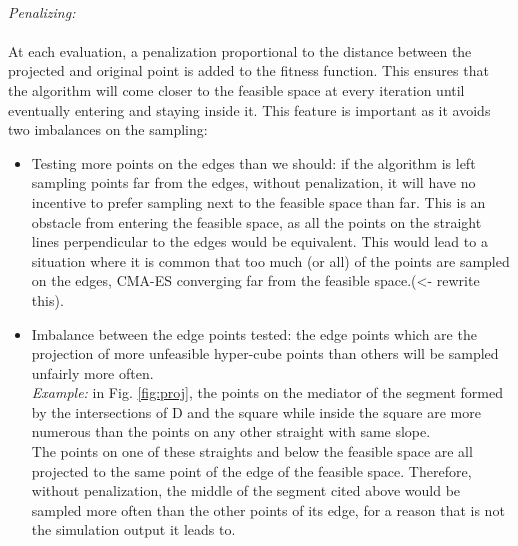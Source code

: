 \\
\emph{Penalizing:}\\
\\
At each evaluation, a penalization proportional to the distance between the projected and original point is added to the fitness function. This ensures that the algorithm will come closer to the feasible space at every iteration until eventually entering and staying inside it. This feature is important as it avoids two imbalances on the sampling:
\begin{itemize}
	\item Testing more points on the edges than we should: if the algorithm is left sampling points far from the edges, without penalization, it will have no incentive to prefer sampling next to the feasible space than far. This is an obstacle from entering the feasible space, as all the points on the straight lines perpendicular to the edges would be equivalent. This would lead to a situation where it is common that too much (or all) of the points are sampled on the edges, CMA-ES converging far from the feasible space.\color{red}(<- rewrite this)\color{black}.
	\item Imbalance between the edge points tested: the edge points which are the projection of more unfeasible hyper-cube points than others will be sampled unfairly more often.\\
	\emph{Example:} in Fig. \ref{fig:proj}, the points on the mediator of the segment formed by the intersections of D and the square while inside the square are more numerous than the points on any other straight with same slope.\\
The points on one of these straights and below the feasible space are all projected to the same point of the edge of the feasible space. Therefore, without penalization, the middle of the segment cited above would be sampled more often than the other points of its edge, for a reason that is not the simulation output it leads to. 
\end{itemize}

